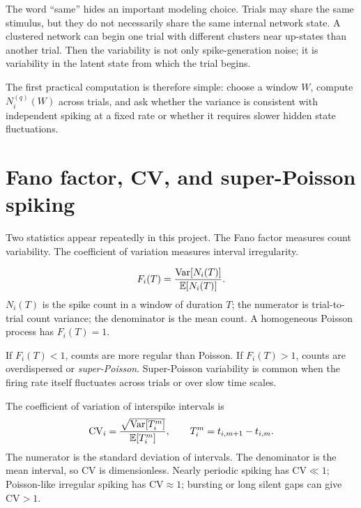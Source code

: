 The word ``same'' hides an important modeling choice. Trials may share the same stimulus, but they do not necessarily share the same internal network state. A clustered network can begin one trial with different clusters near up-states than another trial. Then the variability is not only spike-generation noise; it is variability in the latent state from which the trial begins.

The first practical computation is therefore simple: choose a window $W$, compute $N_i^{(q)}(W)$ across trials, and ask whether the variance is consistent with independent spiking at a fixed rate or whether it requires slower hidden state fluctuations.

\section{Fano factor, CV, and super-Poisson spiking}
\label{sec:fano-cv-super-poisson-spiking}

Two statistics appear repeatedly in this project. The Fano factor measures count variability. The coefficient of variation measures interval irregularity.

\begin{keyequation}
\begin{equation}
  F_i(T)
  =
  \frac{\operatorname{Var}[N_i(T)]}{\mathbb{E}[N_i(T)]}.
  \label{eq:chapter1-fano-factor}
\end{equation}
\tcblower
$N_i(T)$ is the spike count in a window of duration $T$; the numerator is trial-to-trial count variance; the denominator is the mean count. A homogeneous Poisson process has $F_i(T)=1$.
\end{keyequation}

\noindent If $F_i(T)<1$, counts are more regular than Poisson. If $F_i(T)>1$, counts are overdispersed or \emph{super-Poisson}. Super-Poisson variability is common when the firing rate itself fluctuates across trials or over slow time scales.

The coefficient of variation of interspike intervals is
%
\begin{equation}
  \mathrm{CV}_i
  =
  \frac{\sqrt{\operatorname{Var}[T_i^m]}}{\mathbb{E}[T_i^m]},
  \qquad
  T_i^m=t_{i,m+1}-t_{i,m}.
  \label{eq:chapter1-cv}
\end{equation}
%
The numerator is the standard deviation of intervals. The denominator is the mean interval, so CV is dimensionless. Nearly periodic spiking has $\mathrm{CV}\ll 1$; Poisson-like irregular spiking has $\mathrm{CV}\approx 1$; bursting or long silent gaps can give $\mathrm{CV}>1$.

